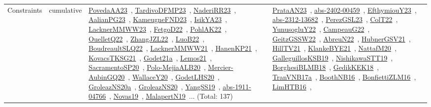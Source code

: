 {\begin{longtable}{lp{3cm}>{\raggedright\arraybackslash}p{6cm}>{\raggedright\arraybackslash}p{6cm}>{\raggedright\arraybackslash}p{8cm}}
Constraints & cumulative & \href{works/PovedaAA23.pdf}{PovedaAA23}~\cite{PovedaAA23}, \href{works/TardivoDFMP23.pdf}{TardivoDFMP23}~\cite{TardivoDFMP23}, \href{works/NaderiRR23.pdf}{NaderiRR23}~\cite{NaderiRR23}, \href{works/AalianPG23.pdf}{AalianPG23}~\cite{AalianPG23}, \href{works/KameugneFND23.pdf}{KameugneFND23}~\cite{KameugneFND23}, \href{works/IsikYA23.pdf}{IsikYA23}~\cite{IsikYA23}, \href{works/LacknerMMWW23.pdf}{LacknerMMWW23}~\cite{LacknerMMWW23}, \href{works/FetgoD22.pdf}{FetgoD22}~\cite{FetgoD22}, \href{works/PohlAK22.pdf}{PohlAK22}~\cite{PohlAK22}, \href{works/OuelletQ22.pdf}{OuelletQ22}~\cite{OuelletQ22}, \href{works/ZhangJZL22.pdf}{ZhangJZL22}~\cite{ZhangJZL22}, \href{works/LuoB22.pdf}{LuoB22}~\cite{LuoB22}, \href{works/BoudreaultSLQ22.pdf}{BoudreaultSLQ22}~\cite{BoudreaultSLQ22}, \href{works/LacknerMMWW21.pdf}{LacknerMMWW21}~\cite{LacknerMMWW21}, \href{works/HanenKP21.pdf}{HanenKP21}~\cite{HanenKP21}, \href{works/KovacsTKSG21.pdf}{KovacsTKSG21}~\cite{KovacsTKSG21}, \href{works/Godet21a.pdf}{Godet21a}~\cite{Godet21a}, \href{works/Lemos21.pdf}{Lemos21}~\cite{Lemos21}, \href{works/SacramentoSP20.pdf}{SacramentoSP20}~\cite{SacramentoSP20}, \href{works/Polo-MejiaALB20.pdf}{Polo-MejiaALB20}~\cite{Polo-MejiaALB20}, \href{works/Mercier-AubinGQ20.pdf}{Mercier-AubinGQ20}~\cite{Mercier-AubinGQ20}, \href{works/WallaceY20.pdf}{WallaceY20}~\cite{WallaceY20}, \href{works/GodetLHS20.pdf}{GodetLHS20}~\cite{GodetLHS20}, \href{works/GroleazNS20a.pdf}{GroleazNS20a}~\cite{GroleazNS20a}, \href{works/GroleazNS20.pdf}{GroleazNS20}~\cite{GroleazNS20}, \href{works/YangSS19.pdf}{YangSS19}~\cite{YangSS19}, \href{works/abs-1911-04766.pdf}{abs-1911-04766}~\cite{abs-1911-04766}, \href{works/Novas19.pdf}{Novas19}~\cite{Novas19}, \href{works/MalapertN19.pdf}{MalapertN19}~\cite{MalapertN19}... (Total: 137) & \href{works/PrataAN23.pdf}{PrataAN23}~\cite{PrataAN23}, \href{works/abs-2402-00459.pdf}{abs-2402-00459}~\cite{abs-2402-00459}, \href{works/EfthymiouY23.pdf}{EfthymiouY23}~\cite{EfthymiouY23}, \href{works/abs-2312-13682.pdf}{abs-2312-13682}~\cite{abs-2312-13682}, \href{works/PerezGSL23.pdf}{PerezGSL23}~\cite{PerezGSL23}, \href{works/ColT22.pdf}{ColT22}~\cite{ColT22}, \href{works/YunusogluY22.pdf}{YunusogluY22}~\cite{YunusogluY22}, \href{works/CampeauG22.pdf}{CampeauG22}~\cite{CampeauG22}, \href{works/GeitzGSSW22.pdf}{GeitzGSSW22}~\cite{GeitzGSSW22}, \href{works/AbreuN22.pdf}{AbreuN22}~\cite{AbreuN22}, \href{works/HubnerGSV21.pdf}{HubnerGSV21}~\cite{HubnerGSV21}, \href{works/HillTV21.pdf}{HillTV21}~\cite{HillTV21}, \href{works/KlankeBYE21.pdf}{KlankeBYE21}~\cite{KlankeBYE21}, \href{works/NattafM20.pdf}{NattafM20}~\cite{NattafM20}, \href{works/GalleguillosKSB19.pdf}{GalleguillosKSB19}~\cite{GalleguillosKSB19}, \href{works/NishikawaSTT19.pdf}{NishikawaSTT19}~\cite{NishikawaSTT19}, \href{works/BorghesiBLMB18.pdf}{BorghesiBLMB18}~\cite{BorghesiBLMB18}, \href{works/GedikKEK18.pdf}{GedikKEK18}~\cite{GedikKEK18}, \href{works/TranVNB17a.pdf}{TranVNB17a}~\cite{TranVNB17a}, \href{works/BoothNB16.pdf}{BoothNB16}~\cite{BoothNB16}, \href{works/BonfiettiZLM16.pdf}{BonfiettiZLM16}~\cite{BonfiettiZLM16}, \href{works/LimHTB16.pdf}{LimHTB16}~\cite{LimHTB16}, 
\end{longtable}}
